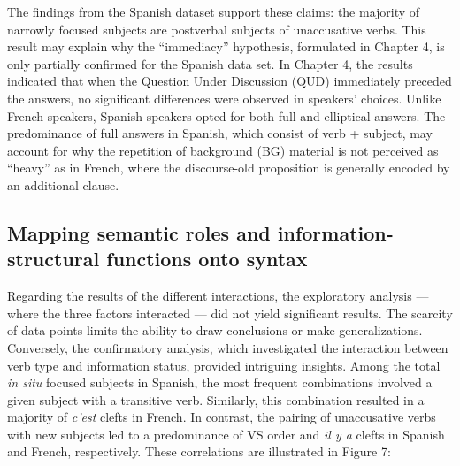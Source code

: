 The findings from the Spanish dataset support these claims: the majority of narrowly focused subjects are postverbal subjects of unaccusative verbs. This result may explain why the ``immediacy” hypothesis, formulated in Chapter 4, is only partially confirmed for the Spanish data set. In Chapter 4, the results indicated that when the Question Under Discussion (QUD) immediately preceded the answers, no significant differences were observed in speakers' choices. Unlike French speakers, Spanish speakers opted for both full and elliptical answers. The predominance of full answers in Spanish, which consist of verb + subject, may account for why the repetition of background (BG) material is not perceived as ``heavy” as in French, where the discourse-old proposition is generally encoded by an additional clause.

\subsection{Mapping semantic roles and information-structural functions onto syntax}
Regarding the results of the different interactions, the exploratory analysis — where the three factors interacted — did not yield significant results. The scarcity of data points limits the ability to draw conclusions or make generalizations. Conversely, the confirmatory analysis, which investigated the interaction between verb type and information status, provided intriguing insights.
Among the total \textit{in situ} focused subjects in Spanish, the most frequent combinations involved a given subject with a transitive verb. Similarly, this combination resulted in a majority of \textit{c'est} clefts in French. In contrast, the pairing of unaccusative verbs with new subjects led to a predominance of VS order and \textit{il y a} clefts in Spanish and French, respectively. These correlations are illustrated in Figure 7:\\

